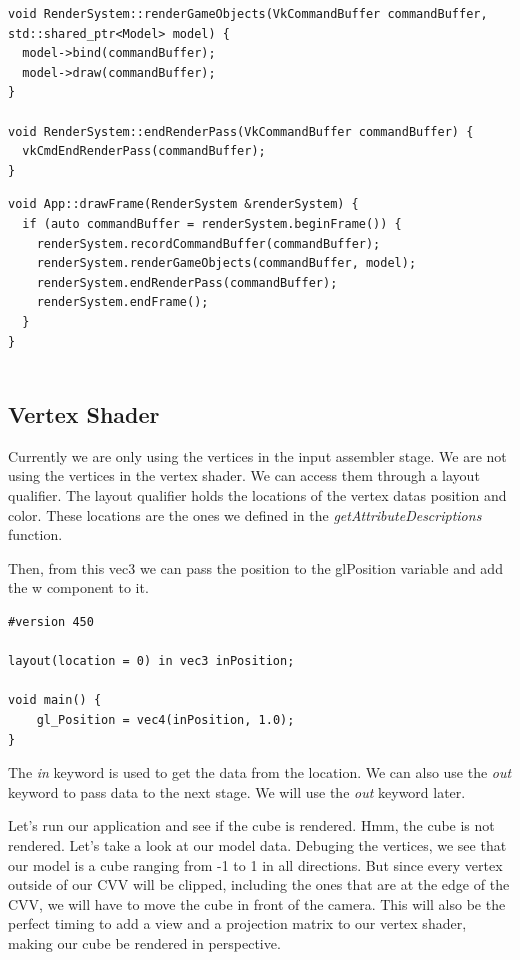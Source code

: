 \documentclass[12pt]{report} \usepackage{preamble}
\begin{document}
\begin{lstlisting}[Language=C++]
void RenderSystem::renderGameObjects(VkCommandBuffer commandBuffer, std::shared_ptr<Model> model) {
  model->bind(commandBuffer);
  model->draw(commandBuffer);
}

void RenderSystem::endRenderPass(VkCommandBuffer commandBuffer) {
  vkCmdEndRenderPass(commandBuffer);
}
\end{lstlisting}

\begin{lstlisting}[Language=C++]
void App::drawFrame(RenderSystem &renderSystem) {
  if (auto commandBuffer = renderSystem.beginFrame()) {
    renderSystem.recordCommandBuffer(commandBuffer);
    renderSystem.renderGameObjects(commandBuffer, model);
    renderSystem.endRenderPass(commandBuffer);
    renderSystem.endFrame();
  }
}
  
\end{lstlisting}

\subsection{Vertex Shader}

Currently we are only using the vertices in the input assembler stage. We are not using the vertices in the vertex shader.
We can access them through a layout qualifier. The layout qualifier holds the locations of the vertex datas position and color.
These locations are the ones we defined in the \textit{getAttributeDescriptions} function.

Then, from this vec3 we can pass the position to the gl\textunderscore Position variable and add the w component to it.

\begin{lstlisting}[Language=C++]
#version 450

layout(location = 0) in vec3 inPosition;

void main() {
	gl_Position = vec4(inPosition, 1.0);
}
\end{lstlisting}

The \textit{in} keyword is used to get the data from the location. We can also use the \textit{out} keyword to pass data to the next stage.
We will use the \textit{out} keyword later.

Let's run our application and see if the cube is rendered. Hmm, the cube is not rendered. Let's take a look at our model data.
Debuging the vertices, we see that our model is a cube ranging from -1 to 1 in all directions. But since every vertex outside of
our \ac{CVV} will be clipped, including the ones that are at the edge of the \ac{CVV}, we will have to move the cube in front of the camera.
This will also be the perfect timing to add a view and a projection matrix to our vertex shader, making our cube be rendered in perspective.
\end{document}
